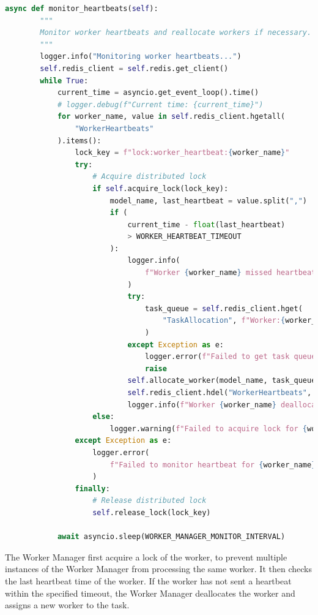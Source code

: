 \begin{lstlisting}[language=python, caption={Worker Fault Tolerance Mechanism}, label={lst:worker_fault_tolerance}]
  async def monitor_heartbeats(self):
        """
        Monitor worker heartbeats and reallocate workers if necessary.
        """
        logger.info("Monitoring worker heartbeats...")
        self.redis_client = self.redis.get_client()
        while True:
            current_time = asyncio.get_event_loop().time()
            # logger.debug(f"Current time: {current_time}")
            for worker_name, value in self.redis_client.hgetall(
                "WorkerHeartbeats"
            ).items():
                lock_key = f"lock:worker_heartbeat:{worker_name}"
                try:
                    # Acquire distributed lock
                    if self.acquire_lock(lock_key):
                        model_name, last_heartbeat = value.split(",")
                        if (
                            current_time - float(last_heartbeat)
                            > WORKER_HEARTBEAT_TIMEOUT
                        ):
                            logger.info(
                                f"Worker {worker_name} missed heartbeat. Allocating new worker."
                            )
                            try:
                                task_queue = self.redis_client.hget(
                                    "TaskAllocation", f"Worker:{worker_name}"
                                )
                            except Exception as e:
                                logger.error(f"Failed to get task queue: {str(e)}")
                                raise
                            self.allocate_worker(model_name, task_queue)
                            self.redis_client.hdel("WorkerHeartbeats", worker_name)
                            logger.info(f"Worker {worker_name} deallocated.")
                    else:
                        logger.warning(f"Failed to acquire lock for {worker_name}")
                except Exception as e:
                    logger.error(
                        f"Failed to monitor heartbeat for {worker_name}: {str(e)}"
                    )
                finally:
                    # Release distributed lock
                    self.release_lock(lock_key)

            await asyncio.sleep(WORKER_MANAGER_MONITOR_INTERVAL)
\end{lstlisting}

The Worker Manager first acquire a lock of the worker, to prevent multiple instances of the Worker Manager from processing the same worker. It then checks the last heartbeat time of the worker. If the worker has not sent a heartbeat within the specified timeout, the Worker Manager deallocates the worker and assigns a new worker to the task.

